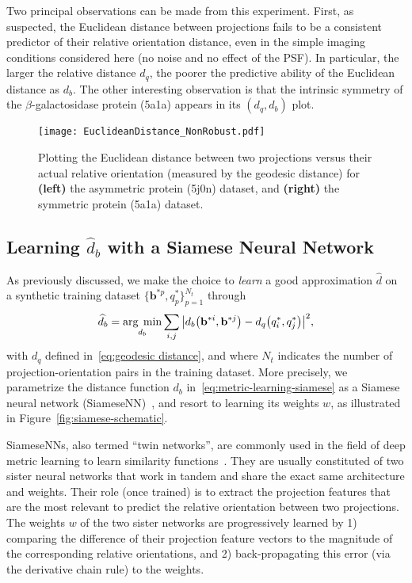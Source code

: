 Two principal observations can be made from this experiment. First, as suspected, the Euclidean distance between projections fails to be a consistent predictor of their relative orientation distance, even in the simple imaging conditions considered here (no noise and no effect of the PSF). In particular, the larger the relative distance $d_q$, the poorer the predictive ability of the Euclidean distance as $d_b$. The other interesting observation is that the intrinsic symmetry of the $\beta$-galactosidase protein (5a1a) appears in its $(d_q,d_b)$ plot.

\begin{figure}[t]
    \centering
    \texttt{[image: EuclideanDistance\_NonRobust.pdf]}
    \caption{Plotting the Euclidean distance between two projections versus their actual relative orientation (measured by the geodesic distance) for \textbf{(left)} the asymmetric protein (5j0n) dataset, and \textbf{(right)} the symmetric protein (5a1a) dataset. }
    \label{fig:euclidean-not-robust}
\end{figure}

\subsection{Learning $\widehat{d}_b$ with a Siamese Neural Network}

As previously discussed, we make the choice to \textit{learn} a good approximation $\widehat{d}$ on a synthetic training dataset $\big\{ \mathbf{b}^{*p}, q^*_p\big\}_{p=1}^{N_t}$ through 
\begin{equation}
    \label{eq:metric-learning-siamese}
    \widehat{d}_b=\underset{d_b}{\arg\;\min}\sum_{i,j} \big|d_b\big(\mathbf{b}^{*i},\mathbf{b}^{*j}\big) - d_q\big(q^*_i,q^*_j\big) \big|^2, 
\end{equation}
with $d_q$ defined in~\eqref{eq:geodesic distance}, and where $N_t$ indicates the number of projection-orientation pairs in the training dataset. More precisely, we parametrize the distance function $d_b$ in~\eqref{eq:metric-learning-siamese} as a Siamese neural network (SiameseNN)~\cite{chopra2005learning}, and resort to learning its weights $w$, as illustrated in Figure~\ref{fig:siamese-schematic}. 

SiameseNNs, also termed ``twin networks'', are commonly used in the field of deep metric learning to learn similarity functions~\cite{yi2014deep}. They are usually constituted of two sister neural networks that work in tandem and share the exact same architecture and weights.  Their role (once trained) is to extract the projection features that are the most relevant to predict the relative orientation between two projections. The weights $w$ of the two sister networks are progressively learned by 1) comparing the difference of their projection feature vectors to the magnitude of the corresponding relative orientations, and 2) back-propagating this error (via the derivative chain rule) to the weights. 

